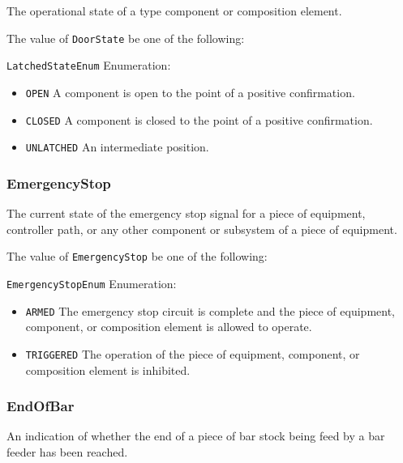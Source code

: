 The operational state of a  type component or composition element.


The value of \texttt{DoorState} \MUST be one of the following: 


\texttt{LatchedStateEnum} Enumeration:

\begin{itemize}
\item \texttt{OPEN} \newline A component is open to the point of a positive confirmation. 
\item \texttt{CLOSED} \newline A component is closed to the point of a positive confirmation. 
\item \texttt{UNLATCHED} \newline An intermediate position. 
\end{itemize}



\subsubsection{EmergencyStop}
\label{sec:EmergencyStop}



The current state of the emergency stop signal for a piece of equipment, controller path, or any other component or subsystem of a piece of equipment.


The value of \texttt{EmergencyStop} \MUST be one of the following: 


\texttt{EmergencyStopEnum} Enumeration:

\begin{itemize}
\item \texttt{ARMED} \newline The emergency stop circuit is complete and the piece of equipment, component, or composition element is allowed to operate.  
\item \texttt{TRIGGERED} \newline The operation of the piece of equipment, component, or composition element is inhibited. 
\end{itemize}



\subsubsection{EndOfBar}




An indication of whether the end of a piece of bar stock being feed by a bar feeder has been reached.


